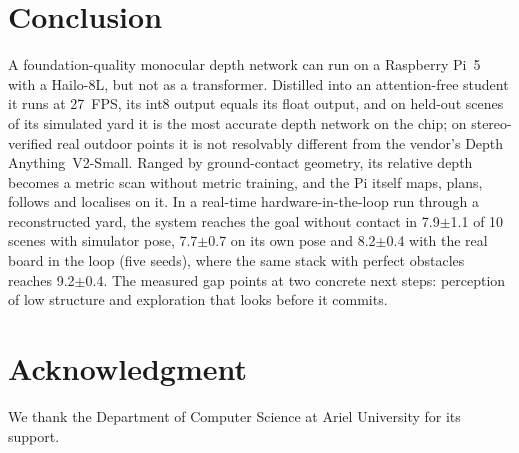 \documentclass[conference]{IEEEtran}
\newcommand{\hailo}{Hailo-8L}
\newcommand{\rpi}{Raspberry Pi~5}
\newcommand{\dav}{Depth Anything~V2}
\begin{document}
\section{Conclusion}
A foundation-quality monocular depth network can run on a \rpi{} with a \hailo{}, but not as a transformer. Distilled into an
attention-free student it runs at 27~FPS, its int8 output equals its float output, and on held-out scenes of its simulated yard
it is the most accurate depth network on the chip; on stereo-verified real outdoor points it is not resolvably different from the vendor's
\dav-Small. Ranged by ground-contact geometry, its relative depth becomes a metric scan without metric training, and the Pi itself
maps, plans, follows and localises on it. In a real-time hardware-in-the-loop run through a reconstructed yard, the system reaches the goal without
contact in 7.9$\pm$1.1 of 10 scenes with simulator pose, 7.7$\pm$0.7 on its own pose and 8.2$\pm$0.4 with the real board in the loop (five seeds), where the same stack
with perfect obstacles reaches 9.2$\pm$0.4. The measured gap points at two concrete next steps: perception of low structure and
exploration that looks before it commits.

\section*{Acknowledgment}
We thank the Department of Computer Science at Ariel University for its support.



\end{document}
